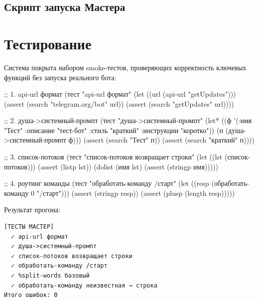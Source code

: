\documentclass[11pt,a4paper]{article}
\begin{document}
\subsection{Скрипт запуска Мастера}


\section{Тестирование}

Система покрыта набором smoke-тестов, проверяющих корректность ключевых функций без запуска реального бота:

\begin{lispcode}[caption={мастер/cl/тесты.lisp — smoke-тесты}]
;; 1. api-url формат
(тест "api-url формат"
  (let ((url (api-url "getUpdates")))
    (assert (search "telegram.org/bot" url))
    (assert (search "getUpdates" url))))

;; 2. душа->системный-промпт
(тест "душа->системный-промпт"
  (let* ((ф '(:имя "Тест" :описание "тест-бот"
              :стиль "краткий" :инструкции "коротко"))
         (п (душа->системный-промпт ф)))
    (assert (search "Тест" п))
    (assert (search "краткий" п))))

;; 3. список-потоков
(тест "список-потоков возвращает строки"
  (let ((lst (список-потоков)))
    (assert (listp lst))
    (dolist (имя lst) (assert (stringp имя)))))

;; 4. роутинг команды
(тест "обработать-команду /старт"
  (let ((resp (обработать-команду 0 "/старт")))
    (assert (stringp resp))
    (assert (plusp (length resp)))))
\end{lispcode}

Результат прогона:
\begin{verbatim}
[ТЕСТЫ МАСТЕР]
  ✓ api-url формат
  ✓ душа->системный-промпт
  ✓ список-потоков возвращает строки
  ✓ обработать-команду /старт
  ✓ %split-words базовый
  ✓ обработать-команду неизвестная → строка
Итого ошибок: 0
\end{verbatim}
\end{document}
